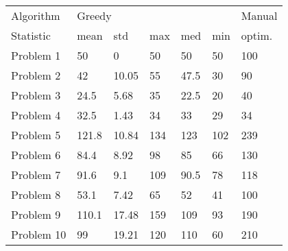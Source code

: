 \begin{tabular}{lllllll}
\toprule
Algorithm & \multicolumn{5}{l}{Greedy} & Manual \\
Statistic &   mean &    std &  max &   med &  min & optim. \\
\midrule
Problem 1  &     50 &      0 &   50 &    50 &   50 &    100 \\
Problem 2  &     42 &  10.05 &   55 &  47.5 &   30 &     90 \\
Problem 3  &   24.5 &   5.68 &   35 &  22.5 &   20 &     40 \\
Problem 4  &   32.5 &   1.43 &   34 &    33 &   29 &     34 \\
Problem 5  &  121.8 &  10.84 &  134 &   123 &  102 &    239 \\
Problem 6  &   84.4 &   8.92 &   98 &    85 &   66 &    130 \\
Problem 7  &   91.6 &    9.1 &  109 &  90.5 &   78 &    118 \\
Problem 8  &   53.1 &   7.42 &   65 &    52 &   41 &    100 \\
Problem 9  &  110.1 &  17.48 &  159 &   109 &   93 &    190 \\
Problem 10 &     99 &  19.21 &  120 &   110 &   60 &    210 \\
\bottomrule
\end{tabular}
